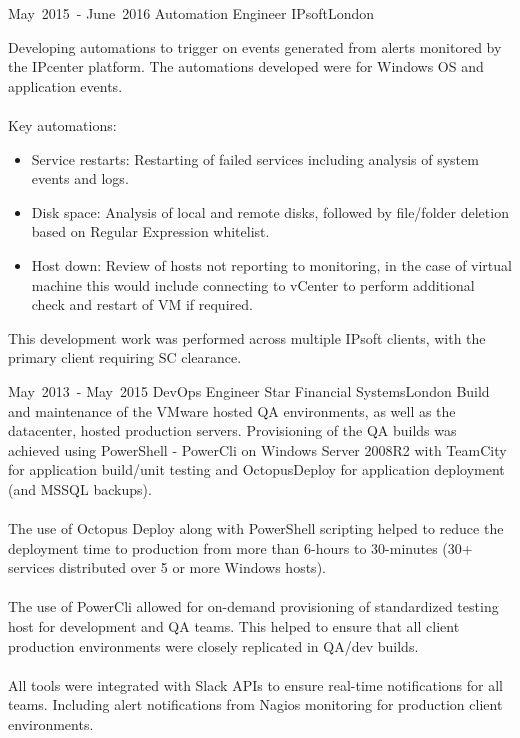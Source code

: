 \cventry %
  {\mbox{May 2015 -} \mbox{June 2016}}
  {Automation Engineer}
  {IPsoft}{London}{}
  {
    Developing automations to trigger on events generated from alerts monitored by the IPcenter platform. 
    The automations developed were for Windows OS and application events.\\~\\
    Key automations:\\
    \begin{itemize}
      \item Service restarts: Restarting of failed services including analysis of system events and logs.\\
      \item Disk space: Analysis of local and remote disks, followed by file/folder deletion based on Regular Expression whitelist.\\
      \item Host down: Review of hosts not reporting to monitoring, in the case of virtual machine this 
            would include connecting to vCenter to perform additional check and restart of VM if required.\\
    \end{itemize}
    This development work was performed across multiple IPsoft clients, with the primary client requiring SC clearance.\\ 
  }

\cventry %
  {\mbox{May 2013 -} \mbox{May 2015}}
  {DevOps Engineer}
  {Star Financial Systems}{London}{}
  {
    Build and maintenance of the VMware hosted QA environments, as well as the datacenter, 
    hosted production servers. Provisioning of the QA builds was achieved using PowerShell - PowerCli 
    on Windows Server 2008R2 with TeamCity for application build/unit testing and OctopusDeploy 
    for application deployment (and MSSQL backups).\\~\\
    The use of Octopus Deploy along with PowerShell scripting helped to reduce the deployment time 
    to production from more than 6-hours to 30-minutes (30+ services distributed over 5 or more Windows hosts).\\~\\
    The use of PowerCli allowed for on-demand provisioning of standardized testing host for development and QA teams. 
    This helped to ensure that all client production environments were closely replicated in QA/dev builds.\\~\\
    All tools were integrated with Slack APIs to ensure real-time notifications for all teams.
    Including alert notifications from Nagios monitoring for production client environments.\\
  }

